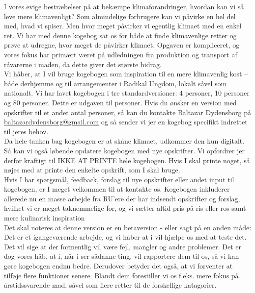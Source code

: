 \documentclass[11pt, a4paper]{article}
\begin{document}
\thispagestyle{empty}
\noindent I vores evige bestræbelser på at bekæmpe klimaforandringer, hvordan kan vi så leve mere klimavenligt? Som almindelige forbrugere kan vi påvirke en hel del med, hvad vi spiser. Men hvor meget påvirker vi egentlig klimaet med en enkel ret. Vi har med denne kogebog sat os for både at finde klimavenlige retter og prøve at udregne, hvor meget de påvirker klimaet. Opgaven er kompliceret, og vores fokus har primært været på udledningen fra produktion og transport af råvarerne i maden, da dette giver det største bidrag.\\

Vi håber, at I vil bruge kogebogen som inspiration til en mere klimavenlig kost – både derhjemme og til arrangementer i Radikal Ungdom, lokalt såvel som nationalt. Vi har lavet kogebogen i tre standardversioner: 4 personer, 10 personer og 80 personer. Dette er udgaven til \ruNumPersons{} personer. Hvis du ønsker en version med opskrifter til et andet antal personer, så kan du kontakte Baltazar Dydensborg på \href{mailto:baltazardydensborg@gmail.com}{baltazardydensborg@gmail.com} og så sender vi jer en kogebog specifikt indrettet til jeres behov.\\

Da hele tanken bag kogebogen er at skåne klimaet, udkommer den kun digitalt. Så kan vi også løbende opdatere kogebogen med nye opskrifter. Vi opfordrer jer derfor kraftigt til IKKE AT PRINTE hele kogebogen. Hvis I skal printe noget, så nøjes med at printe den enkelte opskrift, som I skal bruge.\\

Hvis I har spørgsmål, feedback, forslag til nye opskrifter eller andet input til kogebogen, er I meget velkommen til at kontakte os. Kogebogen inkluderer allerede nu en masse arbejde fra RU'ere der har indsendt opskrifter og forslag, hvilket vi er meget taknemmelige for, og vi sætter altid pris på ris eller ros samt mere kulinarisk inspiration\\

Det skal noteres at denne version er en betaversion - eller sagt på en anden måde: Det er et igangeværende arbejde, og vi håber at i vil hjælpe os med at teste det. Det vil sige at der formentlig vil være fejl, mangler og andre problemer. Det er dog vores håb, at i, når i ser sådanne ting, vil rapportere dem til os, så vi kan gøre kogebogen endnu bedre. Derudover betyder det også, at vi forventer at tilføje flere funktioner senere. Blandt dem forestiller vi os f.eks. mere fokus på årstidssvarende mad, såvel som flere retter til de forskellige katagorier.\\
\end{document}
